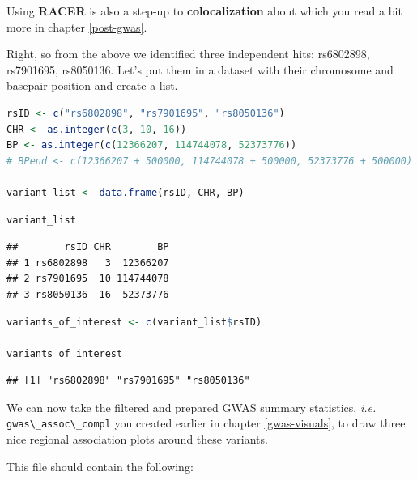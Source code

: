 \documentclass[
]{book}
\newcommand{\passthrough}[1]{#1}
\begin{document}
Using \textbf{RACER} is also a step-up to \textbf{colocalization} about which you read a bit more in chapter \ref{post-gwas}.

Right, so from the above we identified three independent hits: rs6802898, rs7901695, rs8050136. Let's put them in a dataset with their chromosome and basepair position and create a list.

\begin{lstlisting}[language=R]
rsID <- c("rs6802898", "rs7901695", "rs8050136")
CHR <- as.integer(c(3, 10, 16))
BP <- as.integer(c(12366207, 114744078, 52373776))
# BPend <- c(12366207 + 500000, 114744078 + 500000, 52373776 + 500000)

variant_list <- data.frame(rsID, CHR, BP)
\end{lstlisting}

\begin{lstlisting}[language=R]
variant_list
\end{lstlisting}

\begin{lstlisting}
##        rsID CHR        BP
## 1 rs6802898   3  12366207
## 2 rs7901695  10 114744078
## 3 rs8050136  16  52373776
\end{lstlisting}

\begin{lstlisting}[language=R]
variants_of_interest <- c(variant_list$rsID)

variants_of_interest
\end{lstlisting}

\begin{lstlisting}
## [1] "rs6802898" "rs7901695" "rs8050136"
\end{lstlisting}

We can now take the filtered and prepared GWAS summary statistics, \emph{i.e.} \passthrough{\lstinline!gwas\_assoc\_compl!} you created earlier in chapter \ref{gwas-visuals}, to draw three nice regional association plots around these variants.

This file should contain the following:
\end{document}
